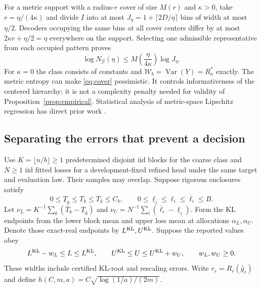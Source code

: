 For a metric support with a radius-$r$ cover of size $M(r)$ and
$\kappa>0$, take $r=\eta/(4\kappa)$ and divide $I$ into at most
$J_\eta=1+\lceil2D/\eta\rceil$ bins of width at most $\eta/2$.
Decoders occupying the same bins at all cover centers differ by at most
$2\kappa r+\eta/2=\eta$ everywhere on the support. Selecting one
admissible representative from each occupied pattern proves
\begin{equation}
 \log N_{\mathcal G}(\eta)
 \leq M\!\left(\frac\eta{4\kappa}\right)\log J_\eta.
 \label{eq:metric-cover}
\end{equation}
For $\kappa=0$ the class consists of constants and
$\mathcal W_b=\operatorname{Var}(Y)=R^*_\kappa$ exactly.
The metric entropy can make \eqref{eq:cover} pessimistic. It controls
informativeness of the centered hierarchy; it is not a complexity penalty
needed for validity of Proposition~\ref{prop:empirical}. Statistical
analysis of metric-space Lipschitz regression has direct prior work
\citep{gottlieb2017regression}.

\subsection{Separating the errors that prevent a decision}

Use $K=\lfloor n/b\rfloor\geq1$ predetermined disjoint iid blocks for
the coarse class and $N\geq1$ iid fitted losses for a development-fixed
refined head under the same target and evaluation law. Their samples may
overlap. Suppose rigorous enclosures satisfy
\[
 0\leq\underline T_k\leq T_k\leq\overline T_k\leq C_b,
 \qquad
 0\leq\underline\ell_i\leq\ell_i\leq\overline\ell_i\leq B.
\]
Let
$\nu_L=K^{-1}\sum_k(\overline T_k-\underline T_k)$ and
$\nu_U=N^{-1}\sum_i(\overline\ell_i-\underline\ell_i)$.
Form the KL endpoints from the lower block mean and upper loss mean at
allocations $\alpha_L,\alpha_U$. Denote those exact-real endpoints by
$L^{\rm KL},U^{\rm KL}$. Suppose the reported values obey
\[
 L^{\rm KL}-w_L\leq L\leq L^{\rm KL},\qquad
 U^{\rm KL}\leq U\leq U^{\rm KL}+w_U,
 \qquad w_L,w_U\geq0.
\]
These widths include certified KL-root and rescaling errors. Write
$r_r=R_r(\widehat g_r)$ and define
$h(C,m,a)=C\sqrt{\log(1/a)/(2m)}$.


